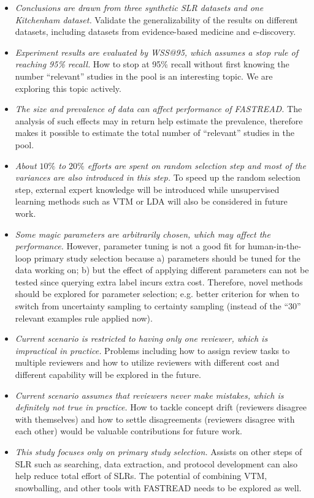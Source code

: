 \documentclass{svjour3}
\theoremstyle{break}
\begin{document}
\begin{itemize}

\item
{\em Conclusions are drawn from three synthetic SLR datasets and one Kitchenham dataset.} Validate the generalizability of the results on different datasets, including datasets from evidence-based medicine and e-discovery.

\item
{\em Experiment results are evaluated by WSS@95, which assumes a stop rule of reaching 95\% recall.} How to stop at 95\% recall without first knowing the number ``relevant'' studies in the pool is an interesting topic. We are exploring this topic actively.

\item
{\em The size and prevalence of data can affect performance of FASTREAD.} The analysis of such effects may in return help estimate the prevalence, therefore makes it possible to estimate the total number of ``relevant'' studies in the pool.

\item
{\em About $10\%$ to $20\%$ efforts are spent on random selection step and most of the variances are also introduced in this step.} To speed up the random selection step, external expert knowledge will be introduced while unsupervised learning methods such as VTM or LDA will also be considered in future work. 

\item
{\em Some magic parameters are arbitrarily chosen, which may affect the performance.} However, parameter tuning is not a good fit for human-in-the-loop primary study selection because a) parameters should be tuned for the data working on; b) but the effect of applying different parameters can not be tested since querying extra label incurs extra cost. Therefore, novel methods should be explored for parameter selection; e.g. better criterion for when to switch from uncertainty sampling to certainty sampling (instead of the ``30'' relevant examples rule applied now).


\item
{\em Current scenario is restricted to having only one reviewer, which is impractical in practice.} Problems including how to assign review tasks to multiple reviewers and how to utilize reviewers with different cost and different capability will be explored in the future.

\item
{\em Current scenario assumes that reviewers never make mistakes, which is definitely not true in practice.} How to tackle concept drift (reviewers disagree with themselves) and how to settle disagreements (reviewers disagree with each other) would be valuable contributions for future work.

\item
{\em This study focuses only on primary study selection.} Assists on other steps of SLR such as searching, data extraction, and protocol development can also help reduce total effort of SLRs. The potential of combining VTM, snowballing, and other tools with FASTREAD needs to be explored as well.


\end{itemize}
\end{document}
